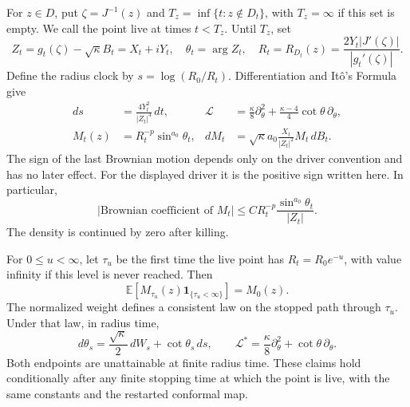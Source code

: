 For $z\in D$, put $\zeta=J^{-1}(z)$ and
$T_z=\inf\{t:z\notin D_t\}$, with $T_z=\infty$ if this set is empty.
We call the point live at times $t<T_z$.  Until $T_z$, set
\[
 Z_t=g_t(\zeta)-\sqrt\kappa B_t=X_t+iY_t,
 \quad\theta_t=\arg Z_t,
 \quad R_t=R_{D_t}(z)=\frac{2Y_t|J'(\zeta)|}{|g_t'(\zeta)|}.
\]
Define the radius clock by $s=\log(R_0/R_t)$.
Differentiation and It\^o's Formula give
\begin{align}
 ds&=\frac{4Y_t^2}{|Z_t|^4}\,dt,
 &\mathcal L&=\frac\kappa8\partial_\theta^2
       +\frac{\kappa-4}{4}\cot\theta\,\partial_\theta,
 \label{ll:clock}\\
 M_t(z)&=R_t^{-p}\sin^{a_0}\theta_t,
 &dM_t&=\sqrt\kappa a_0\frac{X_t}{|Z_t|^2}M_t\,dB_t.
 \label{ll:density}
\end{align}
The sign of the last Brownian motion depends only on the driver
convention and has no later effect. For the displayed driver it is
the positive sign written here.
In particular,
\begin{equation}
 |\text{Brownian coefficient of }M_t|
 \le C R_t^{-p}\frac{\sin^{a_0}\theta_t}{|Z_t|}.
 \label{ll:coefficient}
\end{equation}
The density is continued by zero after killing.

\begin{lemma}\label{ll:finite-tilt}
For $0\le u<\infty$, let $\tau_u$ be the first time the live point has
$R_t=R_0e^{-u}$, with value infinity if this level is never reached.
Then
\[
 \mathbb E\left[M_{\tau_u}(z)
                   \mathbf1_{\{\tau_u<\infty\}}\right]=M_0(z).
\]
The normalized weight defines a consistent law on the stopped path
through $\tau_u$. Under that law, in radius time,
\begin{equation}
 d\theta_s=\frac{\sqrt\kappa}{2}\,dW_s
                    +\cot\theta_s\,ds,
 \qquad
 \mathcal L^*=\frac\kappa8\partial_\theta^2
                    +\cot\theta\,\partial_\theta.
 \label{ll:tilt-generator}
\end{equation}
Both endpoints are unattainable at finite radius time. These claims
hold conditionally after any finite stopping time at which the point
is live, with the same constants and the restarted conformal map.
\end{lemma}

